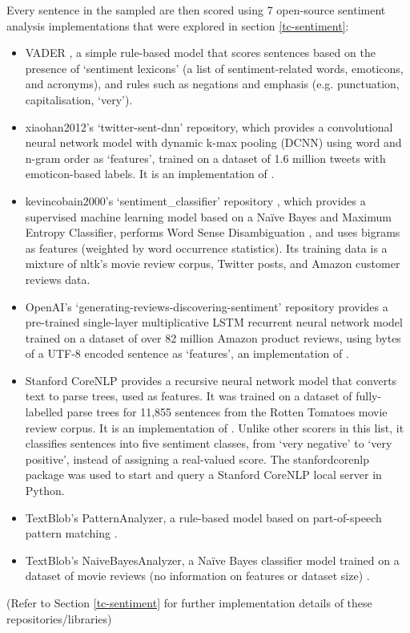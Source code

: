 \documentclass{report}
\begin{document}
Every sentence in the sampled are then scored using 7 open-source sentiment analysis implementations that were explored in section \ref{tc-sentiment}:
\begin{itemize}
	\item VADER \cite{VADER}, a simple rule-based model that scores sentences based on the presence of `sentiment lexicons' (a list of sentiment-related words, emoticons, and acronyms), and rules such as negations and emphasis (e.g. punctuation, capitalisation, `very').
	\item xiaohan2012's `twitter-sent-dnn' repository, which provides a convolutional neural 	network model with dynamic k-max pooling (DCNN) using word and n-gram order as `features', trained on a dataset of 1.6 million tweets with emoticon-based labels. 
		It is an implementation of \cite{kalchbrennerACL2014}.
	\item kevincobain2000's `sentiment\_classifier' repository \cite{kevincobain}, which provides a supervised machine learning model based on a Na\"{i}ve Bayes and Maximum Entropy Classifier, performs Word Sense Disambiguation \cite{banerjee2002adapted}, and uses bigrams as features (weighted by word occurrence statistics).
		Its training data is a mixture of nltk's movie review corpus, Twitter posts, and Amazon customer reviews data.
	\item OpenAI's `generating-reviews-discovering-sentiment' repository provides a pre-trained single-layer multiplicative LSTM recurrent neural network model trained on a dataset of over 82 million Amazon product reviews, using bytes of a UTF-8 encoded sentence as `features', an implementation of \cite{OpenAI}.
	\item Stanford CoreNLP \cite{StanfordNLP} provides a recursive neural network model that converts text to parse trees, used as features. 
	It was trained on a dataset of fully-labelled parse trees for 11,855 sentences from the Rotten Tomatoes movie review corpus.
	It is an implementation of \cite{socher2013recursive}.
	Unlike other scorers in this list, it classifies sentences into five sentiment classes, from `very negative' to `very positive', instead of assigning a real-valued score.
	The stanfordcorenlp package \cite{stanfordcorenlp} was used to start and query a Stanford CoreNLP local server in Python.
	\item TextBlob's PatternAnalyzer, a rule-based model based on part-of-speech pattern matching \cite{textblob}.
	\item TextBlob's NaiveBayesAnalyzer, a Na\"{i}ve Bayes classifier model trained on a dataset of movie reviews (no information on features or dataset size) \cite{textblob}.
\end{itemize}
(Refer to Section \ref{tc-sentiment} for further implementation details of these repositories/libraries)
\end{document}
